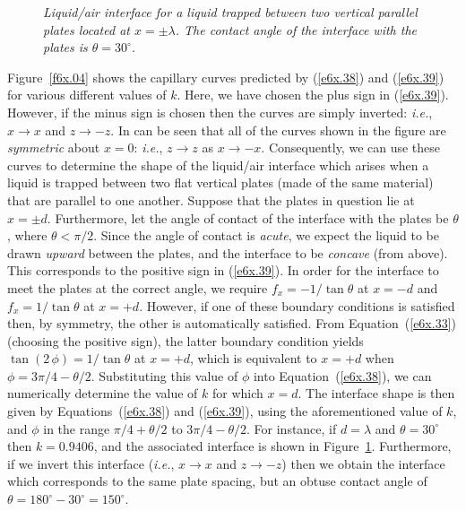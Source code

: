 \begin{figure}
\epsfysize=3.5in
\centerline{}
\caption{\em Liquid/air interface for a liquid trapped between two vertical parallel plates located at $x=\pm\lambda$.
The contact angle of the interface with the plates is $\theta=30^\circ$. }\label{f6x.05}
\end{figure}

Figure~\ref{f6x.04} shows the capillary curves predicted by (\ref{e6x.38}) and (\ref{e6x.39}) for various different values of $k$. Here, we have chosen the plus sign in (\ref{e6x.39}). 
However, if the minus sign is chosen then
the curves  are simply inverted: {\em i.e.}, $x\rightarrow x$ and $z\rightarrow -z$. In can be seen that
all of the  curves shown in the figure are {\em symmetric}\/ about $x=0$: {\em i.e.}, $z\rightarrow z$ as $x\rightarrow -x$. 
Consequently, we can use these curves to determine the shape of the liquid/air interface which arises when a liquid is trapped between
two  flat vertical  plates (made of the same material) that are parallel to one another. Suppose that the plates in question lie at $x=\pm d$. Furthermore, let the angle of contact of the interface 
with the plates be $\theta$, where $\theta <\pi/2$.  Since the angle of contact is {\em acute}, we expect the liquid to
be drawn {\em upward}\/  between the plates, and the interface to be {\em concave}\/ (from above). This corresponds to the
positive sign in (\ref{e6x.39}). In order for the interface to meet the plates at the correct angle, we require
$f_x=-1/\tan\theta$ at $x=-d$ and $f_x=1/\tan\theta$ at $x=+d$. However, if one of these boundary conditions is
satisfied then, by symmetry, the other is automatically satisfied.
From Equation~(\ref{e6x.33}) (choosing the positive sign), the latter boundary condition yields $\tan(2\,\phi)=1/\tan\theta$ at $x=+d$,
which is equivalent to $x=+d$ when $\phi=3\pi/4-\theta/2$. Substituting this value of $\phi$ into Equation~(\ref{e6x.38}), we can numerically determine the
value of $k$ for which $x=d$. The interface shape is then given by Equations~(\ref{e6x.38}) and (\ref{e6x.39}), using
the aforementioned value of $k$, and $\phi$ in the range $\pi/4+\theta/2$ to $3\pi/4-\theta/2$. 
For instance, if $d=\lambda$ and $\theta=30^\circ$ then $k=0.9406$, and the associated interface  is shown
in Figure~\ref{f6x.05}. Furthermore, if we invert this interface ({\em i.e.}, $x\rightarrow x$ and $z\rightarrow -z$) then
we obtain the interface which corresponds to the same plate spacing, but an obtuse contact angle of $\theta=180^\circ-30^\circ=150^\circ$. 

